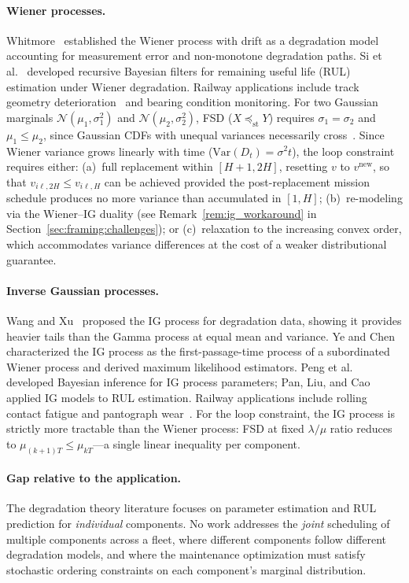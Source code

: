 \documentclass[11pt,a4paper]{article}
\theoremstyle{plain}
\theoremstyle{definition}
\theoremstyle{remark}
\begin{document}
\paragraph{Wiener processes.}
Whitmore~\cite{whitmore1995} established the Wiener process with drift as a degradation model accounting for measurement error and non-monotone degradation paths. Si et al.~\cite{si2013} developed recursive Bayesian filters for remaining useful life (RUL) estimation under Wiener degradation. Railway applications include track geometry deterioration~\cite{guan2020} and bearing condition monitoring. For two Gaussian marginals $\mathcal{N}(\mu_1,\sigma_1^2)$ and $\mathcal{N}(\mu_2,\sigma_2^2)$, FSD ($X \preceq_{\mathrm{st}} Y$) requires $\sigma_1 = \sigma_2$ and $\mu_1 \le \mu_2$, since Gaussian CDFs with unequal variances necessarily cross~\cite{shaked2007}. Since Wiener variance grows linearly with time ($\mathrm{Var}(D_t)=\sigma^2 t$), the loop constraint requires either: (a)~full replacement within $[H{+}1, 2H]$, resetting $v$ to $v^{\mathrm{new}}$, so that $v_{i\ell,2H} \le v_{i\ell,H}$ can be achieved provided the post-replacement mission schedule produces no more variance than accumulated in $[1,H]$; (b)~re-modeling via the Wiener--IG duality (see Remark~\ref{rem:ig_workaround} in Section~\ref{sec:framing:challenges}); or (c)~relaxation to the increasing convex order, which accommodates variance differences at the cost of a weaker distributional guarantee.

\paragraph{Inverse Gaussian processes.}
Wang and Xu~\cite{wang2010} proposed the IG process for degradation data, showing it provides heavier tails than the Gamma process at equal mean and variance. Ye and Chen~\cite{ye2014} characterized the IG process as the first-passage-time process of a subordinated Wiener process and derived maximum likelihood estimators. Peng et al.~\cite{peng2014} developed Bayesian inference for IG process parameters; Pan, Liu, and Cao~\cite{pan2016} applied IG models to RUL estimation. Railway applications include rolling contact fatigue and pantograph wear~\cite{peng2014}. For the loop constraint, the IG process is strictly more tractable than the Wiener process: FSD at fixed $\lambda/\mu$ ratio reduces to $\mu_{(k+1)T}\le\mu_{kT}$---a single linear inequality per component.

\paragraph{Gap relative to the application.}
The degradation theory literature focuses on parameter estimation and RUL prediction for \emph{individual} components. No work addresses the \emph{joint} scheduling of multiple components across a fleet, where different components follow different degradation models, and where the maintenance optimization must satisfy stochastic ordering constraints on each component's marginal distribution.
\end{document}
